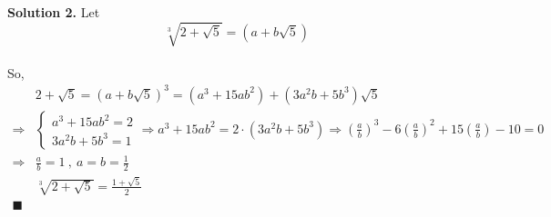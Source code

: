 \documentclass[UTF8]{article}
\begin{document}
\begin{enumerate}
    \noindent \textbf{Solution 2.}  Let $$ \sqrt[3]{2+\sqrt{5}} = (a + b \sqrt{5}) $$ \\
    So, 
    \begin{align*}
        & 2 + \sqrt{5} = (a+b\sqrt{5})^3 = (a^3 + 15ab^2) + (3a^2b + 5b^3)\sqrt{5} \\
        \Longrightarrow & \left\{
            \begin{aligned}
                a^3 + 15ab^2 = 2 \\
                3a^2b + 5b^3 = 1
            \end{aligned}
            \Longrightarrow a^3 + 15ab^2 = 2 \cdot (3a^2b + 5b^3)
            \Longrightarrow (\frac{a}{b})^3 -6(\frac{a}{b})^2 + 15(\frac{a}{b}) -10 = 0
            \right. \\
            \Longrightarrow & \frac{a}{b} = 1 \  , \  a = b = \frac{1}{2} \\
            & \sqrt[3]{2 + \sqrt{5}} = \frac{1+\sqrt{5}}{2} \\
            \blacksquare
        \end{align*}


    \end{enumerate}
\end{document}
